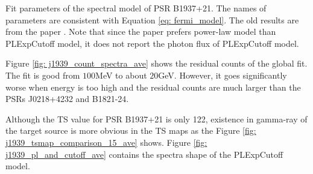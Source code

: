 \documentclass[12pt]{report}
\newcommand{\mycaption}[1]{\protect \caption{#1}}
\begin{document}
            \begin{table}[!ht]
              \centering
                \mycaption{Fit parameters of the spectral model of PSR B1937+21. 
                  The names of parameters are consistent with Equation
                  \ref{eq: fermi_model}. The old results are from the paper \cite{0004-637X-787-2-167}.
                  Note that since the paper prefers power-law model than PLExpCutoff model, it does not 
                  report the photon flux of PLExpCutoff model.}
                \label{table: j1939_fit_result_ave}        
            \end{table} 

            Figure \ref{fig: j1939_count_spectra_ave} shows the residual counts of the global fit.
            The fit is good from $100$MeV to about $20$GeV. However, it goes significantly worse when 
            energy is too high and the residual counts are much larger than the PSRs J0218+4232 and 
            B1821-24.

            Although the TS value for PSR B1937+21 is only 122, existence in gamma-ray of the 
            target source is more obvious in the TS maps as the Figure 
            \ref{fig: j1939_tsmap_comparison_15_ave} shows. Figure 
            \ref{fig: j1939_pl_and_cutoff_ave} contains the spectra shape of the PLExpCutoff model. 
\end{document}
